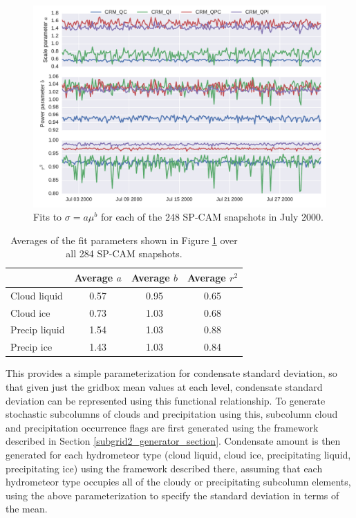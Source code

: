 \begin{figure}
\centering
\includegraphics[width=\columnwidth]{graphics/subgrid2_mxratio_variance_fits.pdf}
\caption{Fits to $\sigma = a \mu^b$ for each of the 248 SP-CAM snapshots in July 2000.}
\label{subgrid2_mxratio_variance_fits}
\end{figure}

\begin{table}
\centering
\begin{tabular}{lccc}
                & Average $a$  & Average $b$  & Average $r^2$ \\ \hline
Cloud liquid    & 0.57 & 0.95 & 0.65 \\
Cloud ice       & 0.73 & 1.03 & 0.68 \\
Precip liquid   & 1.54 & 1.03 & 0.88 \\
Precip ice      & 1.43 & 1.03 & 0.84 \\
\end{tabular}
\caption{Averages of the fit parameters shown in Figure \ref{subgrid2_mxratio_variance_fits} over all 284 SP-CAM snapshots.}
\label{subgrid2_mxratio_variance_fits_table}
\end{table}

This provides a simple parameterization for condensate standard deviation, so that given just the gridbox mean values at each level, condensate standard deviation can be represented using this functional relationship. To generate stochastic subcolumns of clouds and precipitation using this, subcolumn cloud and precipitation occurrence flags are first generated using the framework described in Section \ref{subgrid2_generator_section}. Condensate amount is then generated for each hydrometeor type (cloud liquid, cloud ice, precipitating liquid, precipitating ice) using the framework described there, assuming that each hydrometeor type occupies all of the cloudy or precipitating subcolumn elements, using the above parameterization to specify the standard deviation in terms of the mean.

